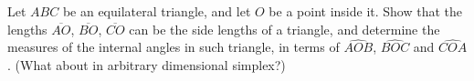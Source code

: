 Let $ABC$ be an equilateral triangle,
and let $O$ be a point inside it.
Show that the lengths $\overline{AO}$, $\overline{BO}$, $\overline{CO}$
can be the side lengths of a triangle,
and determine the measures of the internal angles in such triangle,
in terms of $\widehat{AOB}$, $\widehat{BOC}$ and $\widehat{COA}$.
\newline (What about in arbitrary dimensional simplex?)
